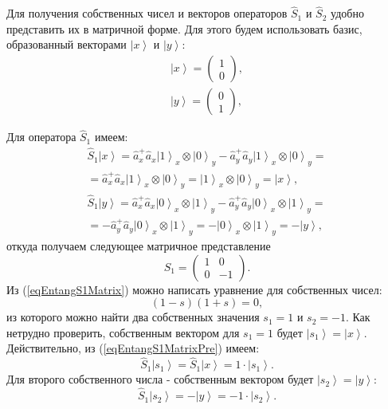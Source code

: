 Для получения собственных чисел и векторов операторов $\hat{S}_1$ и
$\hat{S}_2$ удобно представить их в матричной форме. Для этого будем
использовать базис, образованный векторами $\left|x\right>$ и
$\left|y\right>$:
\begin{eqnarray}
\left|x\right> = \left(
\begin{array}{c}
1 \\
0
\end{array}
\right),
\nonumber \\
\left|y\right> = \left(
\begin{array}{c}
0 \\
1
\end{array}
\right),
\nonumber
\end{eqnarray}

Для оператора $\hat{S}_1$ имеем:
\begin{eqnarray}
\hat{S}_1 \left|x\right> = \hat{a}_x^{+} \hat{a}_x
\left|1\right>_x\otimes\left|0\right>_y - \hat{a}_y^{+}
\hat{a}_y\left|1\right>_x\otimes\left|0\right>_y =
\nonumber \\
= 
\hat{a}_x^{+} \hat{a}_x
\left|1\right>_x\otimes\left|0\right>_y =
\left|1\right>_x\otimes\left|0\right>_y = \left|x\right>,
\nonumber \\
\hat{S}_1 \left|y\right> = \hat{a}_x^{+} \hat{a}_x
\left|0\right>_x\otimes\left|1\right>_y - \hat{a}_y^{+}
\hat{a}_y\left|0\right>_x\otimes\left|1\right>_y =
\nonumber \\
=
-\hat{a}_y^{+}
\hat{a}_y\left|0\right>_x\otimes\left|1\right>_y
=-\left|0\right>_x\otimes\left|1\right>_y = -\left|y\right>,
\label{eqEntangS1MatrixPre}
\end{eqnarray}
откуда получаем следующее матричное представление
\begin{equation}
\hat{S}_1 = 
\left(
\begin{array}{cc}
1 & 0 \\
0 & -1 
\end{array}
\right).
\label{eqEntangS1Matrix}
\end{equation}
Из (\ref{eqEntangS1Matrix}) можно написать уравнение для собственных
чисел:
\[
\left(1-s\right)\left(1 + s\right) = 0,
\]
из которого можно найти два собственных значения $s_1 = 1$ и
$s_2 = -1$. Как нетрудно проверить, собственным вектором для $s_1 = 1$
будет $\left|s_1\right> = \left|x\right>$. Действительно, из (\ref{eqEntangS1MatrixPre})
имеем:
\begin{equation}
\hat{S}_1 \left|s_1\right> = \hat{S}_1 \left|x\right> = 1 \cdot \left|s_1\right>.
\nonumber
\end{equation}
Для второго собственного числа - собственным вектором будет
$\left|s_2\right> = \left|y\right>$:
\begin{equation}
\hat{S}_1 \left|s_2\right>  = - \left|y\right> = -1 \cdot \left|s_2\right>.
\nonumber
\end{equation}


